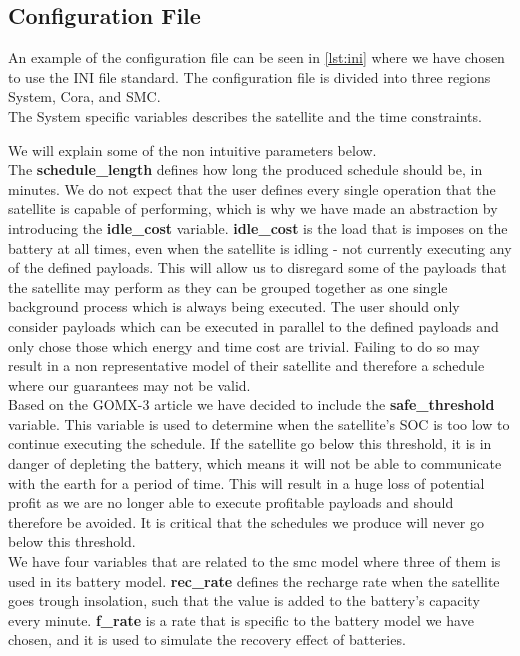 \subsection{Configuration File} \label{subsec:init}
An example of the configuration file can be seen in \cref{lst:ini} where we have chosen to use the INI file standard.
The configuration file is divided into three regions System, Cora, and SMC.\\
The System specific variables describes the satellite and the time constraints.

We will explain some of the non intuitive parameters below.\\
The \textbf{schedule\_length} defines how long the produced schedule should be, in minutes.
We do not expect that the user defines every single operation that the satellite is capable of performing, which is why we have made an abstraction by introducing the \textbf{idle\_cost} variable. 
\textbf{idle\_cost} is the load that is imposes on the battery at all times, even when the satellite is idling - not currently executing any of the defined payloads.
This will allow us to disregard some of the payloads that the satellite may perform as they can be grouped together as one single background process which is always being executed.
The user should only consider payloads which can be executed in parallel to the defined payloads and only chose those which energy and time cost are trivial.
Failing to do so may result in a non representative model of their satellite and therefore a schedule where our guarantees may not be valid.\\
Based on the GOMX-3 article\cite{gomx3} we have decided to include the \textbf{safe\_threshold} variable.
This variable is used to determine when the satellite's SOC is too low to continue executing the schedule.
If the satellite go below this threshold, it is in danger of depleting the battery, which means it will not be able to communicate with the earth for a period of time.
This will result in a huge loss of potential profit as we are no longer able to execute profitable payloads and should therefore be avoided.
It is critical that the schedules we produce will never go below this threshold.\\
We have four variables that are related to the \gls{smc} model where three of them is used in its battery model.
\textbf{rec\_rate} defines the recharge rate when the satellite goes trough insolation, such that the value is added to the battery's capacity every minute.
\textbf{f\_rate} is a rate that is specific to the battery model we have chosen, and it is used to simulate the recovery effect of batteries.
